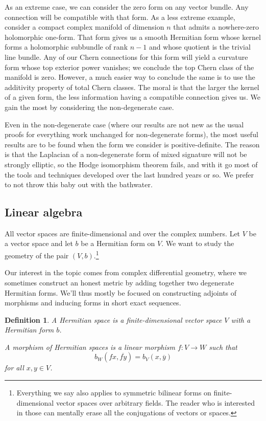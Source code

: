 \documentclass[10pt,a4paper]{article}
\newtheorem{defi}[theo]{Definition}
\def\ov#1{\overline{#1}}
\begin{document}
As an extreme case, we can consider the zero form on any vector bundle. Any connection will be compatible with that form. As a less extreme example, consider a compact complex manifold of dimension $n$ that admits a nowhere-zero holomorphic one-form. That form gives us a smooth Hermitian form whose kernel forms a holomorphic subbundle of rank $n-1$ and whose quotient is the trivial line bundle. Any of our Chern connections for this form will yield a curvature form whose top exterior power vanishes; we conclude the top Chern class of the manifold is zero. However, a much easier way to conclude the same is to use the additivity property of total Chern classes. The moral is that the larger the kernel of a given form, the less information having a compatible connection gives us. We gain the most by considering the non-degenerate case.

Even in the non-degenerate case (where our results are not new as the usual proofs for everything work unchanged for non-degenerate forms), the most useful results are to be found when the form we consider is positive-definite. The reason is that the Laplacian of a non-degenerate form of mixed signature will not be strongly elliptic, so the Hodge isomorphism theorem fails, and with it go most of the tools and techniques developed over the last hundred years or so. We prefer to not throw this baby out with the bathwater.




\subsection{Linear algebra}
\label{sec:degenerate-linear-algebra}



All vector spaces are finite-dimensional and over the complex numbers. Let $V$ be a vector space and let $b$ be a Hermitian form on $V$. We want to study the geometry of the pair $(V,b)$.\footnote{Everything we say also applies to symmetric bilinear forms on finite-dimensional vector spaces over arbitrary fields. The reader who is interested in those can mentally erase all the conjugations of vectors or spaces.}

Our interest in the topic comes from complex differential geometry, where we sometimes construct an honest metric by adding together two degenerate Hermitian forms. We'll thus mostly be focused on constructing adjoints of morphisms and inducing forms in short exact sequences.

\begin{defi}
A \emph{Hermitian space} is a finite-dimensional vector space $V$ with a Hermitian form $b$.

A \emph{morphism} of Hermitian spaces is a linear morphism $f : V \to W$ such that
\[
b_W(fx, \ov{fy}) = b_V(x, \ov y)
\]
for all $x, y \in V$.
\end{defi}
\end{document}
